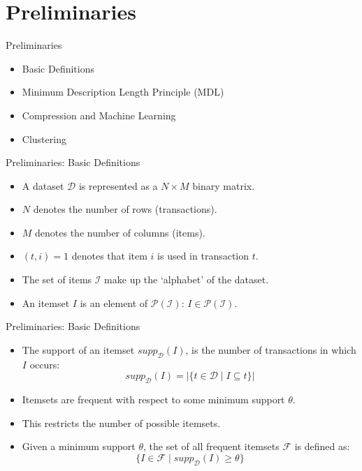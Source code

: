 \documentclass{beamer}
\newcommand{\dataset}{\mathcal{D}}
\newcommand{\itemset}{\mathcal{I}}
\newcommand{\setitemsets}{\mathcal{F}}
\begin{document}
\section{Preliminaries}
\begin{frame}{Preliminaries}
\begin{itemize}
	\item Basic Definitions
	\item Minimum Description Length Principle (MDL)
	\item Compression and Machine Learning
	\item Clustering
\end{itemize}
\end{frame}

\begin{frame}{Preliminaries: Basic Definitions}
\begin{itemize}
	\item A dataset $\dataset$ is represented as a $N\times M$ binary matrix. 
	\item $N$ denotes the number of rows (transactions).
	\item $M$ denotes the number of columns (items).
	\item $(t, i) = 1$ denotes that item $i$ is used in transaction $t$.
	\item The set of items $\itemset$ make up the `alphabet' of the dataset.
	\item An itemset $I$ is an element of $\mathcal{P}(\itemset)$: $I \in \mathcal{P}(\itemset)$.
\end{itemize}
\end{frame}

\begin{frame}{Preliminaries: Basic Definitions}
\begin{itemize}
	\item The support of an itemset $supp_\dataset (I)$, is the number of transactions in which $I$ occurs:
	\[supp_\dataset (I) = |\{t \in \dataset \mid I \subseteq t\}|\]
	\item Itemsets are frequent with respect to some minimum support $\theta$.
	\item This restricts the number of possible itemsets.
	\item Given a minimum support $\theta$, the set of all frequent itemsets $\setitemsets$ is defined as:
	\[\{I \in \setitemsets \mid supp_\dataset (I) \geq \theta\}\]
\end{itemize}
\end{frame}
\end{document}

